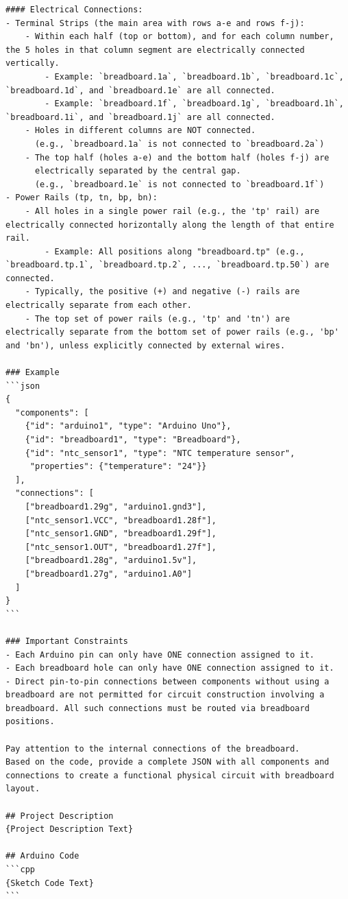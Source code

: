 \documentclass{article} %
\newlength{\promptboxmargin}
\begin{document}
\begin{adjustwidth}{\promptboxmargin}{\promptboxmargin}
\begin{lstlisting}[style=promptstyle, caption={Circuit Generation Task (Physical)}, basicstyle=\ttfamily\footnotesize]
#### Electrical Connections:
- Terminal Strips (the main area with rows a-e and rows f-j):
    - Within each half (top or bottom), and for each column number, the 5 holes in that column segment are electrically connected vertically.
        - Example: `breadboard.1a`, `breadboard.1b`, `breadboard.1c`, `breadboard.1d`, and `breadboard.1e` are all connected.
        - Example: `breadboard.1f`, `breadboard.1g`, `breadboard.1h`, `breadboard.1i`, and `breadboard.1j` are all connected.
    - Holes in different columns are NOT connected.
      (e.g., `breadboard.1a` is not connected to `breadboard.2a`)
    - The top half (holes a-e) and the bottom half (holes f-j) are
      electrically separated by the central gap.
      (e.g., `breadboard.1e` is not connected to `breadboard.1f`)
- Power Rails (tp, tn, bp, bn):
    - All holes in a single power rail (e.g., the 'tp' rail) are electrically connected horizontally along the length of that entire rail.
        - Example: All positions along "breadboard.tp" (e.g., `breadboard.tp.1`, `breadboard.tp.2`, ..., `breadboard.tp.50`) are connected.
    - Typically, the positive (+) and negative (-) rails are electrically separate from each other.
    - The top set of power rails (e.g., 'tp' and 'tn') are electrically separate from the bottom set of power rails (e.g., 'bp' and 'bn'), unless explicitly connected by external wires.

### Example
```json
{
  "components": [
    {"id": "arduino1", "type": "Arduino Uno"},
    {"id": "breadboard1", "type": "Breadboard"},
    {"id": "ntc_sensor1", "type": "NTC temperature sensor",
     "properties": {"temperature": "24"}}
  ],
  "connections": [
    ["breadboard1.29g", "arduino1.gnd3"],
    ["ntc_sensor1.VCC", "breadboard1.28f"],
    ["ntc_sensor1.GND", "breadboard1.29f"],
    ["ntc_sensor1.OUT", "breadboard1.27f"],
    ["breadboard1.28g", "arduino1.5v"],
    ["breadboard1.27g", "arduino1.A0"]
  ]
}
```

### Important Constraints
- Each Arduino pin can only have ONE connection assigned to it.
- Each breadboard hole can only have ONE connection assigned to it.
- Direct pin-to-pin connections between components without using a breadboard are not permitted for circuit construction involving a breadboard. All such connections must be routed via breadboard positions.

Pay attention to the internal connections of the breadboard.
Based on the code, provide a complete JSON with all components and connections to create a functional physical circuit with breadboard layout.

## Project Description
{Project Description Text}

## Arduino Code
```cpp
{Sketch Code Text}
```
\end{lstlisting}
\end{adjustwidth}
\end{document}
